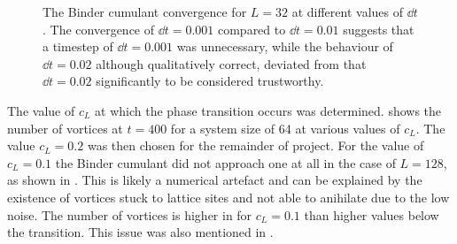 \begin{figure}[htbp!]
\centering
\caption{The Binder cumulant convergence for $L=32$ at different values of $\dd{t}$. The convergence of $\dd{t}=0.001$ compared to $\dd{t}=0.01$ suggests that a timestep of $\dd{t}=0.001$ was unnecessary, while the behaviour of $\dd{t}=0.02$ although qualitatively correct, deviated from that $\dd{t}=0.02$ significantly to be considered trustworthy.}
\label{fig:binder_different_cL}
\end{figure}

The value of $c_L$ at which the phase transition occurs was determined. \fig{\ref{fig:vor_vs_cL}} shows the number of vortices at $t=400$ for a system size of 64 at various values of $c_L$. The value $c_L = 0.2$ was then chosen for the remainder of project. For the value of $c_L=0.1$ the Binder cumulant did not approach one at all in the case of $L=128$, as shown in \fig{\ref{fig:binder_cL_0.1}}. This is likely a numerical artefact and can be explained by the existence of vortices stuck to lattice sites and not able to anihilate due to the low noise. The number of vortices is higher in \fig{\ref{fig:vor_vs_cL}} for $c_L=0.1$ than higher values below the transition. This issue was also mentioned in \cite{PhysRevE.47.1525}.     

